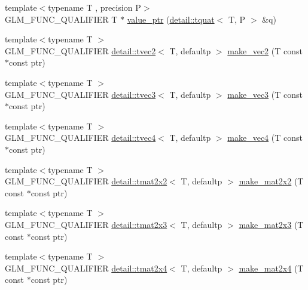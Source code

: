 \begin{DoxyCompactItemize}
\item 
{\footnotesize template$<$typename T , precision P$>$ }\\G\+L\+M\+\_\+\+F\+U\+N\+C\+\_\+\+Q\+U\+A\+L\+I\+F\+I\+ER T $\ast$ \hyperlink{group__gtc__type__ptr_gab72389186ae9e8c822ff6cc9b474a37f}{value\+\_\+ptr} (\hyperlink{structglm_1_1detail_1_1tquat}{detail\+::tquat}$<$ T, P $>$ \&q)
\item 
{\footnotesize template$<$typename T $>$ }\\G\+L\+M\+\_\+\+F\+U\+N\+C\+\_\+\+Q\+U\+A\+L\+I\+F\+I\+ER \hyperlink{structglm_1_1detail_1_1tvec2}{detail\+::tvec2}$<$ T, defaultp $>$ \hyperlink{group__gtc__type__ptr_ga70f570befb4773ba3a658b76f9fdd6ab}{make\+\_\+vec2} (T const $\ast$const ptr)
\item 
{\footnotesize template$<$typename T $>$ }\\G\+L\+M\+\_\+\+F\+U\+N\+C\+\_\+\+Q\+U\+A\+L\+I\+F\+I\+ER \hyperlink{structglm_1_1detail_1_1tvec3}{detail\+::tvec3}$<$ T, defaultp $>$ \hyperlink{group__gtc__type__ptr_gad91a6a0fe324630b151208703a1591ed}{make\+\_\+vec3} (T const $\ast$const ptr)
\item 
{\footnotesize template$<$typename T $>$ }\\G\+L\+M\+\_\+\+F\+U\+N\+C\+\_\+\+Q\+U\+A\+L\+I\+F\+I\+ER \hyperlink{structglm_1_1detail_1_1tvec4}{detail\+::tvec4}$<$ T, defaultp $>$ \hyperlink{group__gtc__type__ptr_ga1b9e0d9ca48d79ba87edc121c1872c44}{make\+\_\+vec4} (T const $\ast$const ptr)
\item 
{\footnotesize template$<$typename T $>$ }\\G\+L\+M\+\_\+\+F\+U\+N\+C\+\_\+\+Q\+U\+A\+L\+I\+F\+I\+ER \hyperlink{structglm_1_1detail_1_1tmat2x2}{detail\+::tmat2x2}$<$ T, defaultp $>$ \hyperlink{group__gtc__type__ptr_ga860d529f631ea6f9a0e510491d29a8ac}{make\+\_\+mat2x2} (T const $\ast$const ptr)
\item 
{\footnotesize template$<$typename T $>$ }\\G\+L\+M\+\_\+\+F\+U\+N\+C\+\_\+\+Q\+U\+A\+L\+I\+F\+I\+ER \hyperlink{structglm_1_1detail_1_1tmat2x3}{detail\+::tmat2x3}$<$ T, defaultp $>$ \hyperlink{group__gtc__type__ptr_gadef48cd950566f23a4b1e47127ee478c}{make\+\_\+mat2x3} (T const $\ast$const ptr)
\item 
{\footnotesize template$<$typename T $>$ }\\G\+L\+M\+\_\+\+F\+U\+N\+C\+\_\+\+Q\+U\+A\+L\+I\+F\+I\+ER \hyperlink{structglm_1_1detail_1_1tmat2x4}{detail\+::tmat2x4}$<$ T, defaultp $>$ \hyperlink{group__gtc__type__ptr_ga174a43e8913682834de9cd918e36df25}{make\+\_\+mat2x4} (T const $\ast$const ptr)

\end{DoxyCompactItemize}
